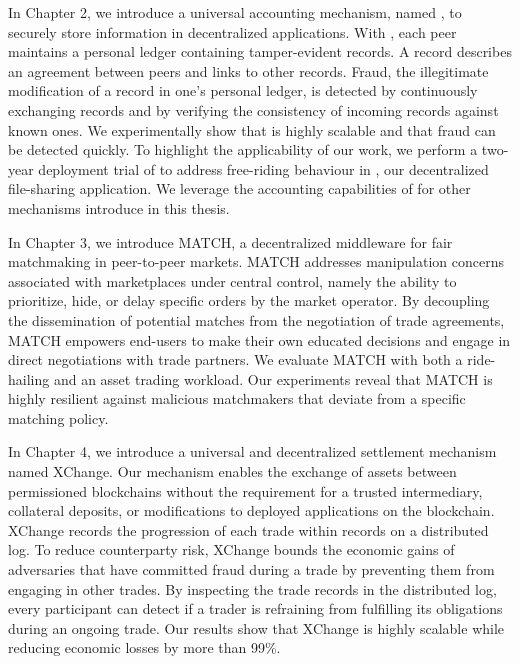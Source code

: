 In Chapter 2, we introduce a universal accounting mechanism, named \TrustChain{}, to securely store information in decentralized applications.
With \TrustChain{}, each peer maintains a personal ledger containing tamper-evident records.
A record describes an agreement between peers and links to other records.
Fraud, the illegitimate modification of a record in one's personal ledger, is detected by continuously exchanging records and by verifying the consistency of incoming records against known ones.
We experimentally show that \TrustChain{} is highly scalable and that fraud can be detected quickly.
To highlight the applicability of our work, we perform a two-year deployment trial of \TrustChain{} to address free-riding behaviour in \Tribler{}, our decentralized file-sharing application.
We leverage the accounting capabilities of \TrustChain{} for other mechanisms introduce in this thesis.

In Chapter 3, we introduce MATCH, a decentralized middleware for fair matchmaking in peer-to-peer markets.
MATCH addresses manipulation concerns associated with marketplaces under central control, namely the ability to prioritize, hide, or delay specific orders by the market operator.
By decoupling the dissemination of potential matches from the negotiation of trade agreements, MATCH empowers end-users to make their own educated decisions and engage in direct negotiations with trade partners.
We evaluate MATCH with both a ride-hailing and an asset trading workload.
Our experiments reveal that MATCH is highly resilient against malicious matchmakers that deviate from a specific matching policy.

In Chapter 4, we introduce a universal and decentralized settlement mechanism named XChange.
Our mechanism enables the exchange of assets between permissioned blockchains without the requirement for a trusted intermediary, collateral deposits, or modifications to deployed applications on the blockchain.
XChange records the progression of each trade within records on a distributed log.
To reduce counterparty risk, XChange bounds the economic gains of adversaries that have committed fraud during a trade by preventing them from engaging in other trades.
By inspecting the trade records in the distributed log, every participant can detect if a trader is refraining from fulfilling its obligations during an ongoing trade.
Our results show that XChange is highly scalable while reducing economic losses by more than 99\%.

